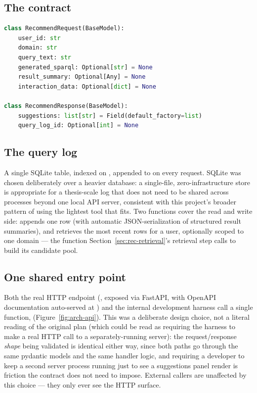 \subsection{The contract}

\begin{lstlisting}[language=Python, caption={The recommender's request/response contract. One
field, \code{interaction\_data}, is deliberately left untyped: its real shape depends on what the
external application actually logs per user, a dependency that was never confirmed during this
thesis (Section~\ref{sec:conclusion-limits}).}]
class RecommendRequest(BaseModel):
    user_id: str
    domain: str
    query_text: str
    generated_sparql: Optional[str] = None
    result_summary: Optional[Any] = None
    interaction_data: Optional[dict] = None

class RecommendResponse(BaseModel):
    suggestions: list[str] = Field(default_factory=list)
    query_log_id: Optional[int] = None
\end{lstlisting}

\subsection{The query log}

A single SQLite table, indexed on , appended to on every request. SQLite
was chosen deliberately over a heavier database: a single-file, zero-infrastructure store is
appropriate for a thesis-scale log that does not need to be shared across processes beyond one
local API server, consistent with this project's broader pattern of using the lightest tool that
fits. Two functions cover the read and write side:  appends one row (with
automatic JSON-serialization of structured result summaries), and 
retrieves the most recent rows for a user, optionally scoped to one domain --- the function
Section~\ref{sec:rec-retrieval}'s retrieval step calls to build its candidate pool.

\subsection{One shared entry point}

Both the real HTTP endpoint (, exposed via FastAPI, with OpenAPI
documentation auto-served at ) and the internal development harness call a single
function,  (Figure~\ref{fig:arch-api}). This was a deliberate design
choice, not a literal reading of the original plan (which could be read as requiring the harness to
make a real HTTP call to a separately-running server): the request/response \emph{shape} being
validated is identical either way, since both paths go through the same pydantic models and the
same handler logic, and requiring a developer to keep a second server process running just to see a
suggestions panel render is friction the contract does not need to impose. External callers are
unaffected by this choice --- they only ever see the HTTP surface.

